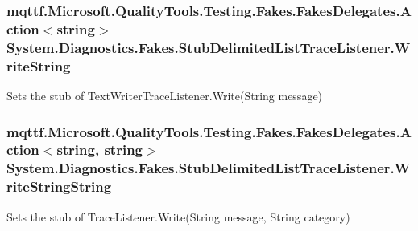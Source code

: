 \hypertarget{class_system_1_1_diagnostics_1_1_fakes_1_1_stub_delimited_list_trace_listener_a630af1bfca293210d442b8ff70637e09}{
\subsubsection[{Write\-String}]{\setlength{\rightskip}{0pt plus 5cm}mqttf.\-Microsoft.\-Quality\-Tools.\-Testing.\-Fakes.\-Fakes\-Delegates.\-Action$<$string$>$ System.\-Diagnostics.\-Fakes.\-Stub\-Delimited\-List\-Trace\-Listener.\-Write\-String}}\label{class_system_1_1_diagnostics_1_1_fakes_1_1_stub_delimited_list_trace_listener_a630af1bfca293210d442b8ff70637e09}


Sets the stub of Text\-Writer\-Trace\-Listener.\-Write(\-String message)

\hypertarget{class_system_1_1_diagnostics_1_1_fakes_1_1_stub_delimited_list_trace_listener_a7398166a90fcf6c8972658eef4ff8c5c}{
\subsubsection[{Write\-String\-String}]{\setlength{\rightskip}{0pt plus 5cm}mqttf.\-Microsoft.\-Quality\-Tools.\-Testing.\-Fakes.\-Fakes\-Delegates.\-Action$<$string, string$>$ System.\-Diagnostics.\-Fakes.\-Stub\-Delimited\-List\-Trace\-Listener.\-Write\-String\-String}}\label{class_system_1_1_diagnostics_1_1_fakes_1_1_stub_delimited_list_trace_listener_a7398166a90fcf6c8972658eef4ff8c5c}


Sets the stub of Trace\-Listener.\-Write(\-String message, String category)



